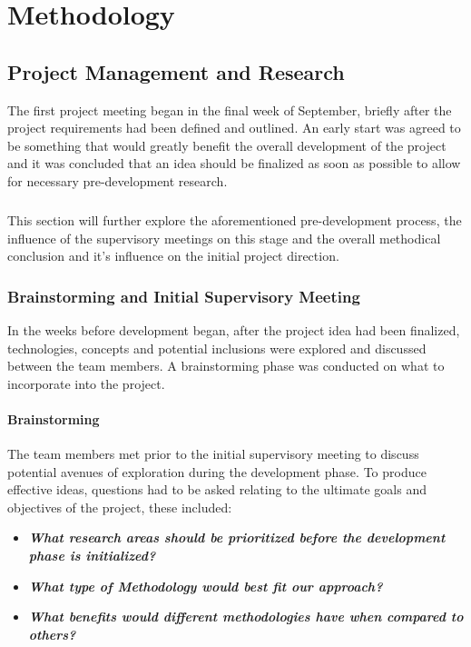\chapter{Methodology}

\section{Project Management and Research}
The first project meeting began in the final week of September, briefly after the project requirements had been defined and outlined. An early start was agreed to be something that would greatly benefit the overall development of the project and it was concluded that an idea should be finalized as soon as possible to allow for necessary pre-development research.

\paragraph{}
This section will further explore the aforementioned pre-development process, the influence of the supervisory meetings on this stage and the overall methodical conclusion and it's influence on the initial project direction.

\subsection{Brainstorming and Initial Supervisory Meeting}
In the weeks before development began, after the project idea had been finalized, technologies, concepts and potential inclusions were explored and discussed between the team members. A brainstorming phase was conducted on what to incorporate into the project.

\subsubsection{Brainstorming}
The team members met prior to the initial supervisory meeting to discuss potential avenues of exploration during the development phase. To produce effective ideas, questions had to be asked relating to the ultimate goals and objectives of the project, these included:

\begin{itemize}
    \item\textit{\textbf{What research areas should be prioritized before the development phase is initialized?}}
    \item\textit{\textbf{What type of Methodology would best fit our approach?}}
    \item\textit{\textbf{What benefits would different methodologies have when compared to others?}}
\end{itemize}

